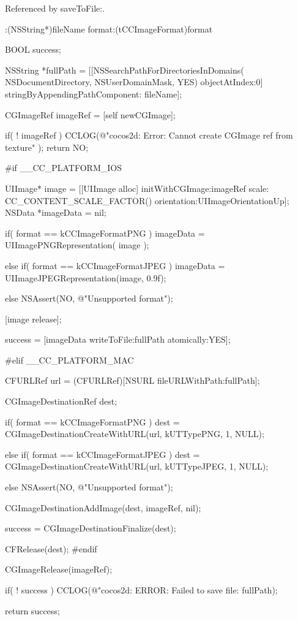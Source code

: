 Referenced by save\-To\-File\-:.


\begin{DoxyCode}
                 :(NSString*)fileName format:(tCCImageFormat)format
{
        BOOL success;
        
        NSString *fullPath = [[NSSearchPathForDirectoriesInDomains(
      NSDocumentDirectory, NSUserDomainMask, YES) objectAtIndex:0] stringByAppendingPathComponent:
      fileName];
        
        CGImageRef imageRef = [self newCGImage];

        if( ! imageRef ) {
                CCLOG(@"cocos2d: Error: Cannot create CGImage ref from texture"
      );
                return NO;
        }
        
#if __CC_PLATFORM_IOS
        
        UIImage* image  = [[UIImage alloc] initWithCGImage:imageRef scale:
      CC_CONTENT_SCALE_FACTOR() orientation:UIImageOrientationUp];
        NSData *imageData = nil;

        if( format == kCCImageFormatPNG )
                imageData = UIImagePNGRepresentation( image );

        else if( format == kCCImageFormatJPEG )
                imageData = UIImageJPEGRepresentation(image, 0.9f);

        else
                NSAssert(NO, @"Unsupported format");
        
        [image release];

        success = [imageData writeToFile:fullPath atomically:YES];

        
#elif __CC_PLATFORM_MAC
        
        CFURLRef url = (CFURLRef)[NSURL fileURLWithPath:fullPath];
        
        CGImageDestinationRef dest;

        if( format == kCCImageFormatPNG )
                dest =  CGImageDestinationCreateWithURL(url, kUTTypePNG, 1, 
      NULL);

        else if( format == kCCImageFormatJPEG )
                dest =  CGImageDestinationCreateWithURL(url, kUTTypeJPEG, 1, 
      NULL);

        else
                NSAssert(NO, @"Unsupported format");

        CGImageDestinationAddImage(dest, imageRef, nil);
                
        success = CGImageDestinationFinalize(dest);

        CFRelease(dest);
#endif

        CGImageRelease(imageRef);
        
        if( ! success )
                CCLOG(@"cocos2d: ERROR: Failed to save file:%
      fullPath);

        return success;
}
\end{DoxyCode}



